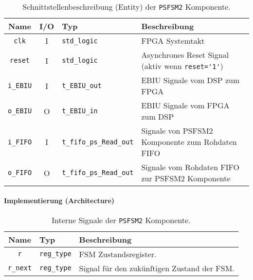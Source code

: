 \begin{table}[htbp]
    \ttabbox
    {
        \caption[PSFSM2 Schnittstelle]{Schnittstellenbeschreibung (Entity) der \lstinline$PSFSM2$ Komponente.}
        \label{TabPSFSM2_Entity}
    }
    {
    \begin{tabular}{c c  p{2.5cm} p{5.5cm}}
        \toprule
        Name                & I/O	& Typ				                & Beschreibung \\
        \midrule
        \lstinline$clk$	    & I	    & \lstinline$std_logic$	        	& FPGA Systemtakt\\
        \lstinline$reset$	& I	    & \lstinline$std_logic$	        	& Asynchrones Reset Signal (aktiv wenn \lstinline$reset='1'$) \\
        \lstinline$i_EBIU$	& I	    & \lstinline$t_EBIU_out$	    	& EBIU Signale vom DSP zum FPGA\\
        \lstinline$o_EBIU$	& O	    & \lstinline$t_EBIU_in$		        & EBIU Signale vom FPGA zum DSP\\
        \lstinline$i_FIFO$	& I	    & \lstinline$t_fifo_ps_Read_out$	& Signale von PSFSM2 Komponente zum Rohdaten FIFO \\
        \lstinline$o_FIFO$	& O	    & \lstinline$t_fifo_ps_Read_out$	& Signale vom Rohdaten FIFO zur PSFSM2 Komponente \\
        \bottomrule
    \end{tabular}
}
\end{table}


\paragraph{Implementierung (Architecture)}

\begin{table}[htbp]
    \ttabbox
    {
        \caption[Interne Signale der PSFSM2 Architecture]{Interne Signale der \lstinline$PSFSM2$ Komponente.}
        \label{TabPSFSM2_ArchSignals}
    }
    {
    \begin{tabular}{c  p{2cm} p{6cm}}
        \toprule
        Name      		& Typ         & Beschreibung \\
        \midrule
        \lstinline$r$		& \lstinline$reg_type$ & \gls{FSM} Zustandsregister.\\
        \lstinline$r_next$	& \lstinline$reg_type$ & Signal für den zukünftigen Zustand der \gls{FSM}.\\
        \bottomrule
    \end{tabular}
}
\end{table}

